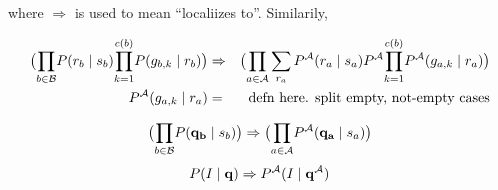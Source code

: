 \documentclass[11pt]{article}
\newcommand{\Active}{{\cal A}}
\begin{document}
where $\Rightarrow$ is used to mean ``localiizes to''. Similarily, 

\begin{eqnarray}
\big( {\displaystyle \prod_{b \in {\cal B}}} P(r_b \mid s_b) {\displaystyle \prod_{k=1}^{c(b)}} P(g_{b,k} \mid r_b) \big) &\Rightarrow& \big( {\displaystyle \prod_{a \in {\cal A}}} \sum_{r_a} P^{\Active}(r_a \mid s_a) P^{\Active}{\displaystyle \prod_{k=1}^{c(b)}} P^{\Active}(g_{a,k} \mid r_a) \big) \\
P^{\Active}(g_{a,k} \mid r_a) &=& \textnormal{defn here. split empty, not-empty cases}
\end{eqnarray}


\begin{eqnarray}
\big( {\displaystyle \prod_{b \in {\cal B}}} P(\mathbf{q_b} \mid s_b)\big) \Rightarrow \big( {\displaystyle \prod_{a \in {\cal A}}} P^{\Active}(\mathbf{q_a} \mid s_a)\big)
\end{eqnarray}
\begin{eqnarray}
P(I \mid \mathbf{q}) \Rightarrow P^{\Active}(I \mid \mathbf{q^{\Active}})
\end{eqnarray}

\end{document}

